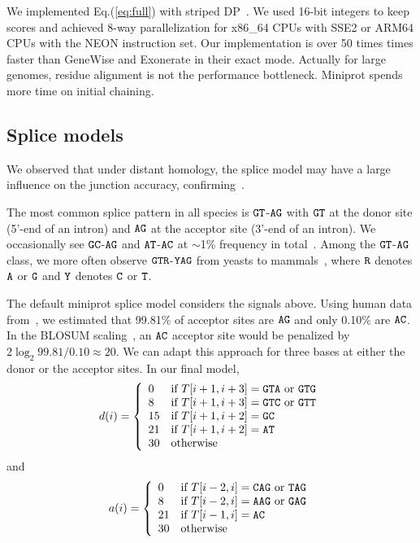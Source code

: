 \documentclass{bioinfo}
\begin{document}
\begin{methods}
We implemented Eq.(\ref{eq:full}) with striped DP~\citep{Farrar:2007hs}.
We used 16-bit integers to keep scores and achieved 8-way parallelization
for x86\_64 CPUs with SSE2 or ARM64 CPUs with the NEON instruction set.
Our implementation is over 50 times times faster than GeneWise and Exonerate in
their exact mode. Actually for large genomes, residue alignment is not the
performance bottleneck. Miniprot spends more time on initial chaining.

\subsection{Splice models}

We observed that under distant homology, the splice model may have a large
influence on the junction accuracy, confirming~\citet{Iwata:2012aa}.

The most common splice pattern in all species is ${\tt GT}$-${\tt AG}$ with
${\tt GT}$ at the donor site (5'-end of an intron) and ${\tt AG}$ at the
acceptor site (3'-end of an intron). We occasionally see ${\tt GC}$-${\tt AG}$
and ${\tt AT}$-${\tt AC}$ at $\sim$1\% frequency in total~\citep{Sheth:2006vg}.
Among the ${\tt GT}$-${\tt AG}$ class, we more often observe ${\tt GTR}$-${\tt
YAG}$ from yeasts to mammals~\citep{Irimia:2008aa}, where ${\tt R}$ denotes
${\tt A}$ or ${\tt G}$ and ${\tt Y}$ denotes ${\tt C}$ or ${\tt T}$.

The default miniprot splice model considers the signals above. Using human data
from~\citet{Sibley:2016vh}, we estimated that 99.81\% of acceptor sites are ${\tt
AG}$ and only 0.10\% are ${\tt AC}$. In the BLOSUM
scaling~\citep{Henikoff:1992tk}, an ${\tt AC}$ acceptor site would be penalized
by $2\log_2 99.81/0.10\approx 20$. We can adapt this approach for three bases at
either the donor or the acceptor sites. In our final model,
$$
d(i)=\left\{\begin{array}{ll}
0 & \mbox{if $T[i+1,i+3]={\tt GTA}$ or ${\tt GTG}$}\\
8 & \mbox{if $T[i+1,i+3]={\tt GTC}$ or ${\tt GTT}$}\\
15 & \mbox{if $T[i+1,i+2]={\tt GC}$}\\
21 & \mbox{if $T[i+1,i+2]={\tt AT}$}\\
30 & \mbox{otherwise}\\
\end{array}\right.
$$
and
$$
a(i)=\left\{\begin{array}{ll}
0 & \mbox{if $T[i-2,i]={\tt CAG}$ or ${\tt TAG}$}\\
8 & \mbox{if $T[i-2,i]={\tt AAG}$ or ${\tt GAG}$}\\
21 & \mbox{if $T[i-1,i]={\tt AC}$}\\
30 & \mbox{otherwise}\\
\end{array}\right.
$$


\end{methods}
\end{document}

